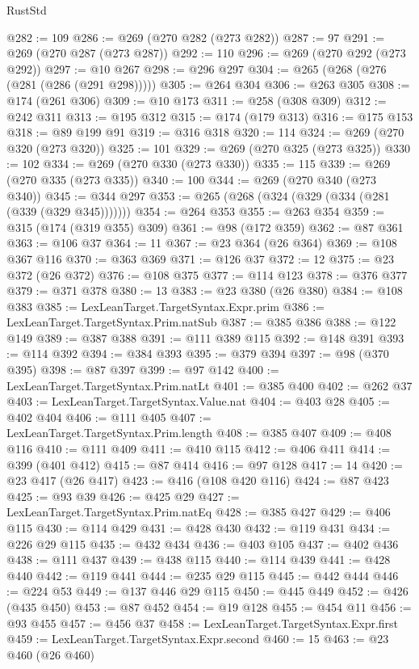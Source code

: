 \begin{lexlean}{RustStd}
\begin{coremodule}
{\begin{coremodule}
{{{{{{{{{{{{{{{{{{{{{{{{{{{{{{{{{{{{{{{{{{{{{{{{{{{{{{{{{{{{{{{{{{{{{{{{{{{{{{@282 := 109
@286 := @269 (@270 @282 (@273 @282))
@287 := 97
@291 := @269 (@270 @287 (@273 @287))
@292 := 110
@296 := @269 (@270 @292 (@273 @292))
@297 := @10 @267
@298 := @296 @297
@304 := @265 (@268 (@276 (@281 (@286 (@291 @298)))))
@305 := @264 @304
@306 := @263 @305
@308 := @174 (@261 @306)
@309 := @10 @173
@311 := @258 (@308 @309)
@312 := @242 @311
@313 := @195 @312
@315 := @174 (@179 @313)
@316 := @175 @153
@318 := @89 @199 @91
@319 := @316 @318
@320 := 114
@324 := @269 (@270 @320 (@273 @320))
@325 := 101
@329 := @269 (@270 @325 (@273 @325))
@330 := 102
@334 := @269 (@270 @330 (@273 @330))
@335 := 115
@339 := @269 (@270 @335 (@273 @335))
@340 := 100
@344 := @269 (@270 @340 (@273 @340))
@345 := @344 @297
@353 := @265 (@268 (@324 (@329 (@334 (@281 (@339 (@329 @345)))))))
@354 := @264 @353
@355 := @263 @354
@359 := @315 (@174 (@319 @355) @309)
@361 := @98 (@172 @359)
@362 := @87 @361
@363 := @106 @37
@364 := 11
@367 := @23 @364 (@26 @364)
@369 := @108 @367 @116
@370 := @363 @369
@371 := @126 @37
@372 := 12
@375 := @23 @372 (@26 @372)
@376 := @108 @375
@377 := @114 @123
@378 := @376 @377
@379 := @371 @378
@380 := 13
@383 := @23 @380 (@26 @380)
@384 := @108 @383
@385 := LexLeanTarget.TargetSyntax.Expr.prim
@386 := LexLeanTarget.TargetSyntax.Prim.natSub
@387 := @385 @386
@388 := @122 @149
@389 := @387 @388
@391 := @111 @389 @115
@392 := @148 @391
@393 := @114 @392
@394 := @384 @393
@395 := @379 @394
@397 := @98 (@370 @395)
@398 := @87 @397
@399 := @97 @142
@400 := LexLeanTarget.TargetSyntax.Prim.natLt
@401 := @385 @400
@402 := @262 @37
@403 := LexLeanTarget.TargetSyntax.Value.nat
@404 := @403 @28
@405 := @402 @404
@406 := @111 @405
@407 := LexLeanTarget.TargetSyntax.Prim.length
@408 := @385 @407
@409 := @408 @116
@410 := @111 @409
@411 := @410 @115
@412 := @406 @411
@414 := @399 (@401 @412)
@415 := @87 @414
@416 := @97 @128
@417 := 14
@420 := @23 @417 (@26 @417)
@423 := @416 (@108 @420 @116)
@424 := @87 @423
@425 := @93 @39
@426 := @425 @29
@427 := LexLeanTarget.TargetSyntax.Prim.natEq
@428 := @385 @427
@429 := @406 @115
@430 := @114 @429
@431 := @428 @430
@432 := @119 @431
@434 := @226 @29 @115
@435 := @432 @434
@436 := @403 @105
@437 := @402 @436
@438 := @111 @437
@439 := @438 @115
@440 := @114 @439
@441 := @428 @440
@442 := @119 @441
@444 := @235 @29 @115
@445 := @442 @444
@446 := @224 @53
@449 := @137 @446 @29 @115
@450 := @445 @449
@452 := @426 (@435 @450)
@453 := @87 @452
@454 := @19 @128
@455 := @454 @11
@456 := @93 @455
@457 := @456 @37
@458 := LexLeanTarget.TargetSyntax.Expr.first
@459 := LexLeanTarget.TargetSyntax.Expr.second
@460 := 15
@463 := @23 @460 (@26 @460)
}}}}}}}}}}}}}}}}}}}}}}}}}}}}}}}}}}}}}}}}}}}}}}}}}}}}}}}}}}}}}}}}}}}}}}}}}}}}}}
\end{coremodule}}
\end{coremodule}
\end{lexlean}
